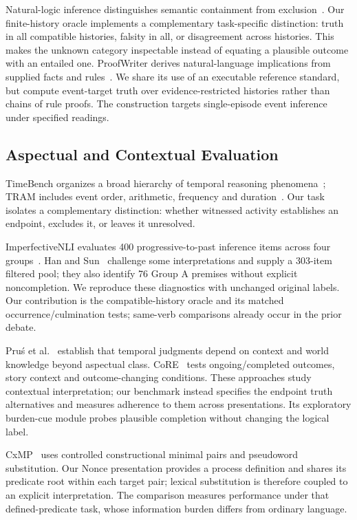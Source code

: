 \documentclass[sigconf,anonymous,review]{acmart}
\begin{document}
Natural-logic inference distinguishes semantic containment from exclusion~\cite{maccartney2008}. Our finite-history oracle implements a complementary task-specific distinction: truth in all compatible histories, falsity in all, or disagreement across histories. This makes the unknown category inspectable instead of equating a plausible outcome with an entailed one. ProofWriter derives natural-language implications from supplied facts and rules~\cite{proofwriter2021}. We share its use of an executable reference standard, but compute event-target truth over evidence-restricted histories rather than chains of rule proofs. The construction targets single-episode event inference under specified readings.

\subsection{Aspectual and Contextual Evaluation}
TimeBench organizes a broad hierarchy of temporal reasoning phenomena~\cite{timebench2024}; TRAM includes event order, arithmetic, frequency and duration~\cite{tram2024}. Our task isolates a complementary distinction: whether witnessed activity establishes an endpoint, excludes it, or leaves it unresolved.

ImperfectiveNLI evaluates 400 progressive-to-past inference items across four groups~\cite{ma2026}. Han and Sun~\cite{han2026} challenge some interpretations and supply a 303-item filtered pool; they also identify 76 Group A premises without explicit noncompletion. We reproduce these diagnostics with unchanged original labels. Our contribution is the compatible-history oracle and its matched occurrence/culmination tests; same-verb comparisons already occur in the prior debate.

Pru\'{s} et al.~\cite{prus2024,prus2025} establish that temporal judgments depend on context and world knowledge beyond aspectual class. CoRE~\cite{core2025} tests ongoing/completed outcomes, story context and outcome-changing conditions. These approaches study contextual interpretation; our benchmark instead specifies the endpoint truth alternatives and measures adherence to them across presentations. Its exploratory burden-cue module probes plausible completion without changing the logical label.

CxMP~\cite{cxmp2026} uses controlled constructional minimal pairs and pseudoword substitution. Our Nonce presentation provides a process definition and shares its predicate root within each target pair; lexical substitution is therefore coupled to an explicit interpretation. The comparison measures performance under that defined-predicate task, whose information burden differs from ordinary language.
\end{document}
